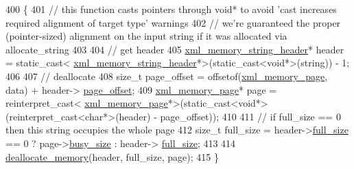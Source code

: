 \begin{DoxyCode}
400         \{
401             \textcolor{comment}{// this function casts pointers through void* to avoid 'cast increases required alignment of
       target type' warnings}
402             \textcolor{comment}{// we're guaranteed the proper (pointer-sized) alignment on the input string if it was
       allocated via allocate\_string}
403 
404             \textcolor{comment}{// get header}
405             \hyperlink{structxml__memory__string__header}{xml\_memory\_string\_header}* header = \textcolor{keyword}{static\_cast<}
      \hyperlink{structxml__memory__string__header}{xml\_memory\_string\_header}*\textcolor{keyword}{>}(\textcolor{keyword}{static\_cast<}\textcolor{keywordtype}{void}*\textcolor{keyword}{>}(string)) - 1;
406 
407             \textcolor{comment}{// deallocate}
408             \textcolor{keywordtype}{size\_t} page\_offset = offsetof(\hyperlink{structxml__memory__page}{xml\_memory\_page}, data) + header->
      \hyperlink{structxml__memory__string__header_a0cc274672f1263f73eeb6bf839bf96ee}{page\_offset};
409             \hyperlink{structxml__memory__page}{xml\_memory\_page}* page = \textcolor{keyword}{reinterpret\_cast<}
      \hyperlink{structxml__memory__page}{xml\_memory\_page}*\textcolor{keyword}{>}(\textcolor{keyword}{static\_cast<}\textcolor{keywordtype}{void}*\textcolor{keyword}{>}(\textcolor{keyword}{reinterpret\_cast<}\textcolor{keywordtype}{char}*\textcolor{keyword}{>}(header) - page\_offset));
410 
411             \textcolor{comment}{// if full\_size == 0 then this string occupies the whole page}
412             \textcolor{keywordtype}{size\_t} full\_size = header->\hyperlink{structxml__memory__string__header_abbb48a709081e6610dffad322499e3f7}{full\_size} == 0 ? page->\hyperlink{structxml__memory__page_a04780ddabc14b45baba3d1ded79d355a}{busy\_size} : header->
      \hyperlink{structxml__memory__string__header_abbb48a709081e6610dffad322499e3f7}{full\_size};
413 
414             \hyperlink{structxml__allocator_a5df417155487cce4e0460b123ac33dc6}{deallocate\_memory}(header, full\_size, page);
415         \}
\end{DoxyCode}


